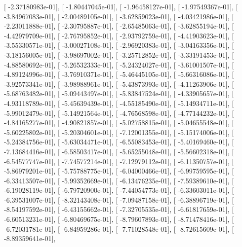 \documentclass{article}
\begin{document}
       [ -2.37180983e-01],
       [ -1.80447045e-01],
       [ -1.96458127e-01],
       [ -1.97549367e-01],
       [ -3.84967083e-01],
       [ -2.00489105e-01],
       [ -3.62859023e-01],
       [ -4.03421986e-01],
       [ -2.23011888e-01],
       [ -2.30795887e-01],
       [ -2.65485063e-01],
       [ -3.62855194e-01],
       [ -4.42979709e-01],
       [ -2.76795852e-01],
       [ -2.93792759e-01],
       [ -4.41903623e-01],
       [ -3.55330571e-01],
       [ -3.00027108e-01],
       [ -2.96920383e-01],
       [ -3.04163356e-01],
       [ -3.18156005e-01],
       [ -3.98697002e-01],
       [ -3.25712852e-01],
       [ -3.33191453e-01],
       [ -4.88580692e-01],
       [ -5.26532333e-01],
       [ -5.24324027e-01],
       [ -3.61001507e-01],
       [ -4.89124996e-01],
       [ -3.76910371e-01],
       [ -5.46445105e-01],
       [ -5.66316086e-01],
       [ -3.92573341e-01],
       [ -3.98988961e-01],
       [ -5.43873993e-01],
       [ -4.11263906e-01],
       [ -5.68763482e-01],
       [ -5.09443497e-01],
       [ -5.83847524e-01],
       [ -4.33905657e-01],
       [ -4.93118789e-01],
       [ -5.45639439e-01],
       [ -4.55185490e-01],
       [ -5.14934711e-01],
       [ -5.99012479e-01],
       [ -5.14921564e-01],
       [ -4.76568598e-01],
       [ -4.77144232e-01],
       [ -4.84165277e-01],
       [ -4.90821857e-01],
       [ -5.02758815e-01],
       [ -5.04655548e-01],
       [ -5.60225802e-01],
       [ -5.20304601e-01],
       [ -7.12001355e-01],
       [ -5.15174006e-01],
       [ -5.24384756e-01],
       [ -5.63034471e-01],
       [ -6.55083453e-01],
       [ -5.40169460e-01],
       [ -7.13684416e-01],
       [ -6.58503417e-01],
       [ -5.65255048e-01],
       [ -5.56602318e-01],
       [ -6.54577747e-01],
       [ -7.74577214e-01],
       [ -7.12979112e-01],
       [ -6.11350757e-01],
       [ -5.86979201e-01],
       [ -5.75788775e-01],
       [ -6.04000466e-01],
       [ -6.99759595e-01],
       [ -6.33413507e-01],
       [ -5.99352669e-01],
       [ -6.13476235e-01],
       [ -7.59389610e-01],
       [ -6.19028119e-01],
       [ -6.79720900e-01],
       [ -7.44054773e-01],
       [ -6.33603011e-01],
       [ -6.39531007e-01],
       [ -8.32143408e-01],
       [ -7.09487158e-01],
       [ -6.38896719e-01],
       [ -8.54197592e-01],
       [ -6.43155662e-01],
       [ -7.32705535e-01],
       [ -6.61817659e-01],
       [ -6.60513231e-01],
       [ -6.80469675e-01],
       [ -8.79607893e-01],
       [ -8.71478416e-01],
       [ -6.72031781e-01],
       [ -6.84959286e-01],
       [ -7.71028548e-01],
       [ -8.72615609e-01],
       [ -8.89359641e-01],
\end{document}

